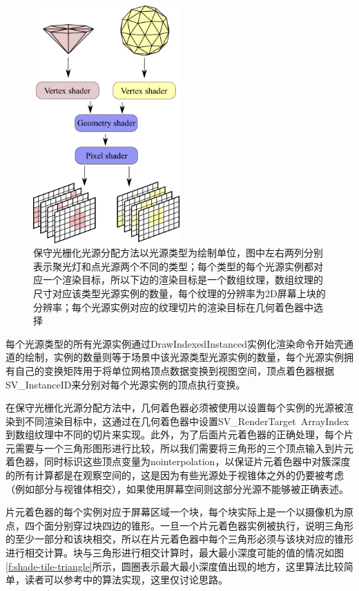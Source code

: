 \begin{figure}
	\sidecaption
	\includegraphics[width=0.5\textwidth]{figures/shade/shell-pass}
	\caption{保守光栅化光源分配方法以光源类型为绘制单位，图中左右两列分别表示聚光灯和点光源两个不同的类型；每个类型的每个光源实例都对应一个渲染目标，所以下边的渲染目标是一个数组纹理，数组纹理的尺寸对应该类型光源实例的数量，每个纹理的分辨率为2D屏幕上块的分辨率；每个光源实例对应的纹理切片的渲染目标在几何着色器中选择}
	\label{f:shade-shell-pass}
\end{figure}

每个光源类型的所有光源实例通过DrawIndexedInstanced实例化渲染命令开始壳通道的绘制，实例的数量则等于场景中该光源类型光源实例的数量，每个光源实例拥有自己的变换矩阵用于将单位网格顶点数据变换到视图空间，顶点着色器根据SV\_InstanceID来分别对每个光源实例的顶点执行变换。

在保守光栅化光源分配方法中，几何着色器必须被使用以设置每个实例的光源被渲染到不同渲染目标中，这通过在几何着色器中设置SV\_RenderTarget\ ArrayIndex到数组纹理中不同的切片来实现。此外，为了后面片元着色器的正确处理，每个片元需要与一个三角形图形进行比较，所以我们需要将三角形的三个顶点输入到片元着色器，同时标识这些顶点变量为nointerpolation，以保证片元着色器中对簇深度的所有计算都是在观察空间的，这是因为有些光源处于视锥体之外的仍要被考虑（例如部分与视锥体相交），如果使用屏幕空间则这部分光源不能够被正确表述。

片元着色器的每个实例对应于屏幕区域一个块，每个块实际上是一个以摄像机为原点，四个面分别穿过块四边的锥形。一旦一个片元着色器实例被执行，说明三角形的至少一部分和该块相交，所以在片元着色器中每个三角形必须与该块对应的锥形进行相交计算。块与三角形进行相交计算时，最大最小深度可能的值的情况如图\ref{f:shade-tile-triangle}所示，圆圈表示最大最小深度值出现的地方，这里算法比较简单，读者可以参考\cite{a:GPUPro7:AdvancedRenderingTechniques}中的算法实现，这里仅讨论思路。

